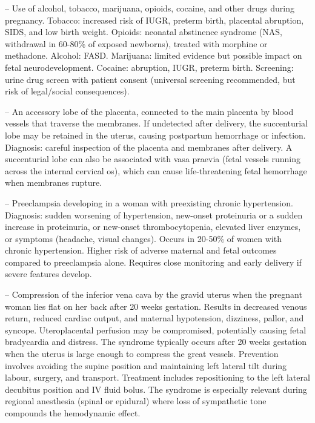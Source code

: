 -- Use of alcohol, tobacco, marijuana, opioids, cocaine, and other drugs during pregnancy. Tobacco: increased risk of IUGR, preterm birth, placental abruption, SIDS, and low birth weight. Opioids: neonatal abstinence syndrome (NAS, withdrawal in 60-80\% of exposed newborns), treated with morphine or methadone. Alcohol: FASD. Marijuana: limited evidence but possible impact on fetal neurodevelopment. Cocaine: abruption, IUGR, preterm birth. Screening: urine drug screen with patient consent (universal screening recommended, but risk of legal/social consequences).

-- An accessory lobe of the placenta, connected to the main placenta by blood vessels that traverse the membranes. If undetected after delivery, the succenturial lobe may be retained in the uterus, causing postpartum hemorrhage or infection. Diagnosis: careful inspection of the placenta and membranes after delivery. A succenturial lobe can also be associated with vasa praevia (fetal vessels running across the internal cervical os), which can cause life-threatening fetal hemorrhage when membranes rupture.

-- Preeclampsia developing in a woman with preexisting chronic hypertension. Diagnosis: sudden worsening of hypertension, new-onset proteinuria or a sudden increase in proteinuria, or new-onset thrombocytopenia, elevated liver enzymes, or symptoms (headache, visual changes). Occurs in 20-50\% of women with chronic hypertension. Higher risk of adverse maternal and fetal outcomes compared to preeclampsia alone. Requires close monitoring and early delivery if severe features develop.

-- Compression of the inferior vena cava by the gravid uterus when the pregnant woman lies flat on her back after 20 weeks gestation. Results in decreased venous return, reduced cardiac output, and maternal hypotension, dizziness, pallor, and syncope. Uteroplacental perfusion may be compromised, potentially causing fetal bradycardia and distress. The syndrome typically occurs after 20 weeks gestation when the uterus is large enough to compress the great vessels. Prevention involves avoiding the supine position and maintaining left lateral tilt during labour, surgery, and transport. Treatment includes repositioning to the left lateral decubitus position and IV fluid bolus. The syndrome is especially relevant during regional anesthesia (spinal or epidural) where loss of sympathetic tone compounds the hemodynamic effect.

